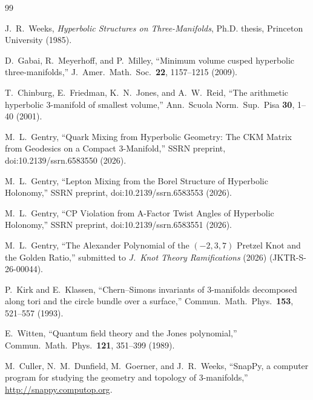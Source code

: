 \documentclass[12pt]{article}
\theoremstyle{definition}
\begin{document}
\begin{thebibliography}{99}

  J.~R.~Weeks,
  \emph{Hyperbolic Structures on Three-Manifolds},
  Ph.D. thesis, Princeton University (1985).

  D.~Gabai, R.~Meyerhoff, and P.~Milley,
  ``Minimum volume cusped hyperbolic three-manifolds,''
  J.\ Amer.\ Math.\ Soc.\ \textbf{22}, 1157--1215 (2009).

  T.~Chinburg, E.~Friedman, K.~N.~Jones, and A.~W.~Reid,
  ``The arithmetic hyperbolic 3-manifold of smallest volume,''
  Ann.\ Scuola Norm.\ Sup.\ Pisa \textbf{30}, 1--40 (2001).

  M.~L.~Gentry,
  ``Quark Mixing from Hyperbolic Geometry: The CKM Matrix from
  Geodesics on a Compact 3-Manifold,''
  SSRN preprint, doi:10.2139/ssrn.6583550 (2026).

  M.~L.~Gentry,
  ``Lepton Mixing from the Borel Structure of Hyperbolic Holonomy,''
  SSRN preprint, doi:10.2139/ssrn.6583553 (2026).

  M.~L.~Gentry,
  ``CP Violation from A-Factor Twist Angles of Hyperbolic Holonomy,''
  SSRN preprint, doi:10.2139/ssrn.6583551 (2026).

  M.~L.~Gentry,
  ``The Alexander Polynomial of the $(-2,3,7)$ Pretzel Knot
  and the Golden Ratio,''
  submitted to \textit{J.\ Knot Theory Ramifications} (2026)
  (JKTR-S-26-00044).

  P.~Kirk and E.~Klassen,
  ``Chern--Simons invariants of 3-manifolds decomposed along tori
  and the circle bundle over a surface,''
  Commun.\ Math.\ Phys.\ \textbf{153}, 521--557 (1993).

  E.~Witten,
  ``Quantum field theory and the Jones polynomial,''
  Commun.\ Math.\ Phys.\ \textbf{121}, 351--399 (1989).

  M.~Culler, N.~M.~Dunfield, M.~Goerner, and J.~R.~Weeks,
  ``SnapPy, a computer program for studying the geometry and topology
  of 3-manifolds,'' \url{http://snappy.computop.org}.

\end{thebibliography}
\end{document}
